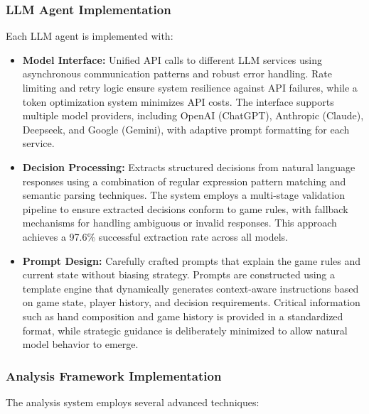 \documentclass{article}
\begin{document}
\subsubsection{LLM Agent Implementation}
Each LLM agent is implemented with:
\begin{itemize}
    \item \textbf{Model Interface:} Unified API calls to different LLM services using asynchronous communication patterns and robust error handling. Rate limiting and retry logic ensure system resilience against API failures, while a token optimization system minimizes API costs. The interface supports multiple model providers, including OpenAI (ChatGPT), Anthropic (Claude), Deepseek, and Google (Gemini), with adaptive prompt formatting for each service.
    
    \item \textbf{Decision Processing:} Extracts structured decisions from natural language responses using a combination of regular expression pattern matching and semantic parsing techniques. The system employs a multi-stage validation pipeline to ensure extracted decisions conform to game rules, with fallback mechanisms for handling ambiguous or invalid responses. This approach achieves a 97.6\% successful extraction rate across all models.
    
    \item \textbf{Prompt Design:} Carefully crafted prompts that explain the game rules and current state without biasing strategy. Prompts are constructed using a template engine that dynamically generates context-aware instructions based on game state, player history, and decision requirements. Critical information such as hand composition and game history is provided in a standardized format, while strategic guidance is deliberately minimized to allow natural model behavior to emerge.
\end{itemize}

\subsubsection{Analysis Framework Implementation}
The analysis system employs several advanced techniques:
\end{document}
